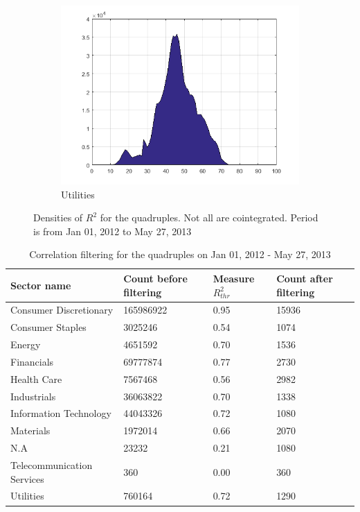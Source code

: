 \documentclass[11pt,a4,twosided,singlespacing,titlepagenumber=on]{scrreprt}
\numberwithin{equation}{chapter} %
\theoremstyle{remark}
\begin{document}
\begin{figure}[H]
\begin{subfigure}[t]{0.23\textwidth}
        \includegraphics[width=1\textwidth]{quad/11}
        \caption{Utilities}
    \end{subfigure}
\caption{Densities of $R^2$ for the quadruples. Not all are cointegrated. Period is from Jan 01, 2012 to May 27, 2013}
\label{dist_100_r2_quad}
\end{figure}

\begin{table}[H]
\centering
\begin{tabular}{llll}
\hline
\multicolumn{1}{|l|}{Sector name}     & \multicolumn{1}{|l|}{Count before filtering} & \multicolumn{1}{|l|}{Measure $R_{thr}^2$} & \multicolumn{1}{l|}{Count after filtering} \\ \hline
Consumer Discretionary						 &  165986922 & 0.95 & 15936 \\
Consumer Staples                   &  3025246 & 0.54 & 1074\\
Energy                             &  4651592 & 0.70 & 1536\\
Financials                         &  69777874 & 0.77 & 2730\\
Health Care                        &  7567468 & 0.56 & 2982\\
Industrials                        &  36063822 & 0.70 & 1338\\
Information Technology             & 44043326 & 0.72 & 1080\\
Materials                          & 1972014 & 0.66 & 2070\\
N.A                                & 23232 & 0.21 & 1080\\
Telecommunication Services         & 360 & 0.00 & 360\\
Utilities                          & 760164 & 0.72 & 1290\\
\hline
\end{tabular}
\caption{Correlation filtering for the quadruples on Jan 01, 2012 - May 27, 2013}
\label{corr_quad}
\end{table}
\end{document}
